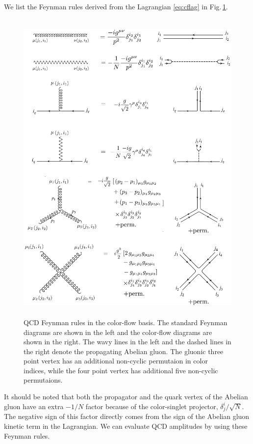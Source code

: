 \documentclass[a4paper,11pt]{article}
\begin{document}
We list the Feynman rules derived from the Lagrangian  \eqref{eq:cflag} in
Fig.\,\ref{fig:diagrams}. 
\begin{figure}
\begin{center}
\includegraphics[width=140mm,height=160mm]{./figures/feynman_rules9.eps}
\caption{QCD Feynman rules in the color-flow basis. The standard
Feynman diagrams are shown in the left and the color-flow diagrams are
 shown in the right. The wavy lines in the left and the dashed lines in the right denote the propagating Abelian gluon. The
 gluonic three point vertex has an additional non-cyclic
 permutaion in color indices, while the four point vertex has additional five non-cyclic permutaions.}
\label{fig:diagrams}
\end{center}
\end{figure}
It should be noted that both the propagator and the quark vertex of the Abelian gluon have an extra
$-1/N$ factor because of the color-singlet projector, $\delta^i_j/\sqrt{N}$. The negative sign of this factor directly comes from the sign
of the Abelian gluon kinetic term in the Lagrangian. We can evaluate QCD amplitudes by using these Feynman rules.
 
\end{document}
